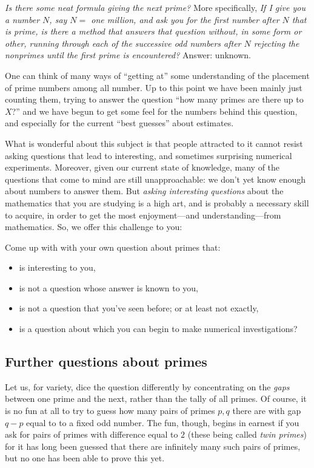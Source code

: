 \documentclass[11pt]{article}
\theoremstyle{plain}
\theoremstyle{definition}
\numberwithin{equation}{section}
\numberwithin{figure}{section}
\numberwithin{table}{section}
\begin{document}
{\em Is there some neat formula giving the next prime?} More
specifically, {\em If I give you a number $N$, say $N=$ one million,
  and ask you for the first number after $N$ that is prime, is there a
  method that answers that question without, in some form or other,
  running through each of the successive odd numbers after $N$ rejecting
  the nonprimes until the first prime is encountered?}  Answer:
unknown.

\bigskip

One can think of many ways of ``getting at'' some understanding of the
placement of prime numbers among all number.  Up to this point we have
been mainly just counting them, trying to answer the question ``how
many primes are there up to $X$?''  and we have begun to get some feel
for the numbers behind this question, and especially for the current
``best guesses'' about estimates.
   

What is wonderful about this subject is that people attracted to it
cannot resist asking questions that lead to interesting, and sometimes
surprising numerical experiments. Moreover, given our current state of
knowledge, many of the questions that come to mind are still
unapproachable: we don't yet know enough about numbers to answer them.
But {\it asking interesting questions} about the mathematics that you
are studying is a high art, and is probably a necessary skill to
acquire, in order to get the most enjoyment---and understanding---from
mathematics.  So, we offer this challenge to you:

Come up with with your own question about primes that:
 
 \begin{itemize}
 \item     is interesting to you,
  \item    is not a question whose answer is known to you,
 \item     is not a question that you've seen before; or at least not exactly,
  \item    is a question about which you can begin to make numerical investigations? 
 \end{itemize}
 
\subsection{Further questions about primes} 

Let us, for variety, dice the question differently by concentrating on
the {\em gaps} between one prime and the next, rather than the tally
of all primes. Of course, it is no fun at all to try to guess how many
pairs of primes $p, q$ there are with gap $q-p$ equal to to a fixed
odd number.  The fun, though, begins in earnest if you ask for pairs
of primes with difference equal to $2$ (these being called {\em twin
  primes}) for it has long been guessed that there are infinitely many
such pairs of primes, but no one has been able to prove this yet.
\end{document}
